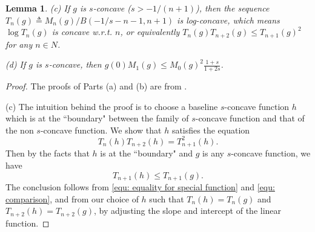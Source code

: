 \documentclass[11pt]{article}
\newtheorem{lemma}[theorem]{Lemma}
\begin{document}
{{{{\begin{lemma}
(c) If $g$ is $s$-concave ($s>-1/(n+1)$), then the sequence $T_n(g)\triangleq M_n(g)/B(-1/s-n-1,n+1)$ is log-concave, which means $\log T_n(g)$ is concave w.r.t. $n$, or equivalently $T_n(g)T_{n+2}(g)\le T_{n+1}(g)^2$ for any $n\in N$.

(d) If $g$ is $s$-concave, then
$g(0)M_1(g)\le M_0(g)^2\frac{1+s}{1+2s}$.
\end{lemma}

\medskip
\begin{proof}
The proofs of Parts (a) and (b) are from \cite{lovasz2007geometry}.

(c) The intuition behind the proof is to choose a baseline $s$-concave function $h$ which is at the ``boundary" between the family of $s$-concave function and that of the non $s$-concave function. We show that $h$ satisfies the equation
\begin{equation}
\label{equ: equality for special function}
T_n(h)T_{n+2}(h)=T_{n+1}^2(h).
\end{equation}
Then by the facts that $h$ is at the ``boundary" and $g$ is any $s$-concave function, we have
\begin{equation}
\label{equ: comparison}
T_{n+1}(h)\le T_{n+1}(g).
\end{equation}
The conclusion follows from \eqref{equ: equality for special function} and \eqref{equ: comparison}, and from our choice of $h$ such that $T_n(h)=T_n(g)$ and $T_{n+2}(h)=T_{n+2}(g)$, by adjusting the slope and intercept of the linear function.


\end{proof}}}}}
\end{document}
